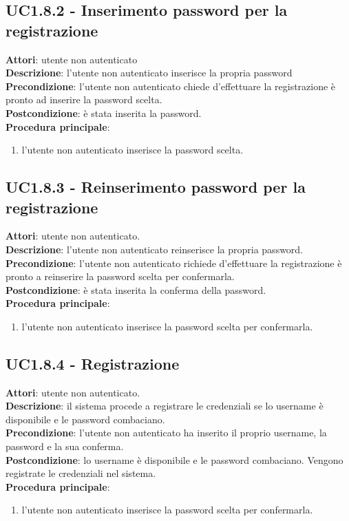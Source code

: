 	\subsection{UC1.8.2 - Inserimento password per la registrazione} {
		\label{uc1.8.2}
		\textbf{Attori}: utente non autenticato \\
		\textbf{Descrizione}: l'utente non autenticato inserisce la propria password	\\
		\textbf{Precondizione}: l'utente non autenticato chiede d'effettuare la registrazione è pronto ad inserire la password scelta.	\\
		\textbf{Postcondizione}: è stata inserita la password.	\\
		\textbf{Procedura principale}: 
		\begin{enumerate}
			\item l'utente non autenticato inserisce la password scelta.
		\end{enumerate}
		}
	\subsection{UC1.8.3 - Reinserimento password per la registrazione} {
		\label{uc1.8.3}
		\textbf{Attori}: utente non autenticato. \\
		\textbf{Descrizione}: l'utente non autenticato reinserisce la propria password.	\\
		\textbf{Precondizione}: l'utente non autenticato richiede d'effettuare la registrazione è pronto a reinserire la password scelta per confermarla.	\\
		\textbf{Postcondizione}: è stata inserita la conferma della password.	\\
		\textbf{Procedura principale}:
		\begin{enumerate}
			\item l'utente non autenticato inserisce la password scelta per confermarla.
		\end{enumerate}
		}
	\subsection{UC1.8.4 - Registrazione} {
		\label{uc1.8.4}
		\textbf{Attori}: utente non autenticato. \\
		\textbf{Descrizione}: il sistema procede a registrare le credenziali se lo username è disponibile e le password combaciano.	\\
		\textbf{Precondizione}: l'utente non autenticato ha inserito il proprio username, la password e la sua conferma.	\\
		\textbf{Postcondizione}: lo username è disponibile e le password combaciano. Vengono registrate le credenziali nel sistema.	\\
		\textbf{Procedura principale}:
		\begin{enumerate}
			\item l'utente non autenticato inserisce la password scelta per confermarla.
		\end{enumerate}
		}